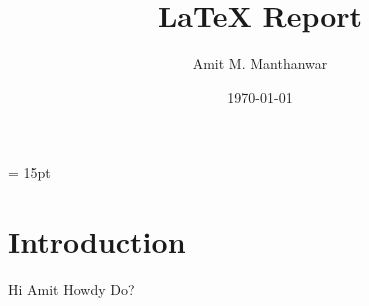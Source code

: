 \documentclass{amm-pst-report}
\title{\LaTeX{} Report}
\author{Amit M. Manthanwar}
\date{\today}
\begin{document}
\maketitle
\pagestyle{fancy}
\baselineskip = 15pt

\section{Introduction}

Hi Amit Howdy Do?

\begin{figure}[!h]
\centering%
%
\end{figure}%



\end{document}
